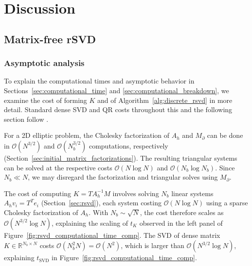 \section{Discussion}
\label{sec:conclusions}


\subsection{Matrix-free rSVD}
\subsubsection{Asymptotic analysis}
To explain the computational times and asymptotic behavior in Sections~\ref{sec:computational_time} and \ref{sec:computational_breakdown}, we examine the cost of forming $K$ and of Algorithm~\ref{alg:discrete_rsvd} in more detail. Standard dense SVD and QR costs throughout this and the following section follow \cite{golubMatrixComputations4th2013}.

For a 2D elliptic problem, the Cholesky factorization of $A_h$ and $M_\partial$ can be done in $\mathcal{O}(N^{3/2})$ and $\mathcal{O}(N_b^{3/2})$ computations, respectively (Section~\ref{sec:initial_matrix_factorizations}). The resulting triangular systems can be solved at the respective costs $\mathcal{O}(N \log N)$ and $\mathcal{O}(N_b \log N_b)$. Since $N_b \ll N$, we may disregard the factorization and triangular solves using $M_\partial$. 

The cost of computing $K = T A_h^{-1} M$ involves solving $N_b$ linear systems $A_h v_i = T^T e_i$ (Section~\ref{sec:rsvd}), each system costing $\mathcal{O}(N \log N)$ using a sparse Cholesky factorization of $A_h$. With $N_b \sim \sqrt{N}$, the cost therefore scales as $\mathcal{O}(N^{3/2} \log N)$, explaining the scaling of $t_K$ observed in the left panel of Figure~\ref{fig:rsvd_computational_time_comp}. The SVD of dense matrix $K \in \mathbb{R}^{N_b \times N}$ costs $\mathcal{O}(N_b^2 N) = \mathcal{O}(N^2)$, which is larger than $\mathcal{O}(N^{3/2} \log N)$, explaining $t_{\text{SVD}}$ in Figure~\ref{fig:rsvd_computational_time_comp}.


